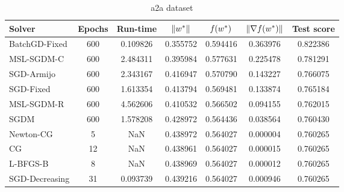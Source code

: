\begin{table}
\caption{a2a dataset}
\label{tab:a2a-tab}
\centering
\begin{tabular}{lS[drop-zero-decimal]S[round-precision=4]S[round-precision=6]S[round-precision=6]S[exponent-mode=scientific]S[round-precision=6]}
\toprule
Solver & {Epochs} & {Run-time} & {$\lVert w^\ast\rVert$} & {$\operatorname*{\mathit{f}}(w^\ast)$} & {$\lVert\nabla f(w^\ast)\rVert$} & {Test score} \\
\midrule
BatchGD-Fixed & 600 & 0.109826 & 0.355752 & 0.594416 & 0.363976 & 0.822386 \\
MSL-SGDM-C & 600 & 2.484311 & 0.395984 & 0.577631 & 0.225478 & 0.781291 \\
SGD-Armijo & 600 & 2.343167 & 0.416947 & 0.570790 & 0.143227 & 0.766075 \\
SGD-Fixed & 600 & 1.613354 & 0.413794 & 0.569481 & 0.133874 & 0.765184 \\
MSL-SGDM-R & 600 & 4.562606 & 0.410532 & 0.566502 & 0.094155 & 0.762015 \\
SGDM & 600 & 1.578208 & 0.428972 & 0.564436 & 0.038564 & 0.760430 \\
Newton-CG & 5 & NaN & 0.438972 & 0.564027 & 0.000004 & 0.760265 \\
CG & 12 & NaN & 0.438961 & 0.564027 & 0.000015 & 0.760265 \\
L-BFGS-B & 8 & NaN & 0.438969 & 0.564027 & 0.000012 & 0.760265 \\
SGD-Decreasing & 31 & 0.093739 & 0.439216 & 0.564027 & 0.000946 & 0.760265 \\
\bottomrule
\end{tabular}
\end{table}


